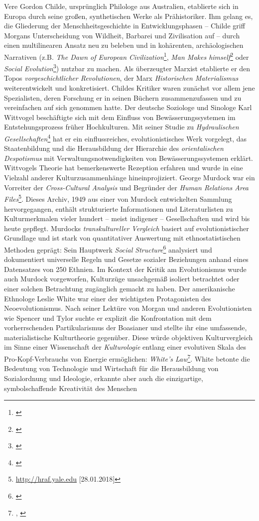 \documentclass[openany,twoside,twocolumn]{book}
\let\rmarkdownfootnote\footnote%
\def\footnote{\protect\rmarkdownfootnote}
\begin{document}
Vere Gordon Childe, ursprünglich Philologe aus Australien, etablierte sich in Europa durch seine großen, synthetischen Werke als Prähistoriker. Ihm gelang es, die Gliederung der Menschheitsgeschichte in Entwicklungsphasen -- Childe griff Morgans Unterscheidung von Wildheit, Barbarei und Zivilisation auf -- durch einen multilinearen Ansatz neu zu beleben und in kohärenten, archäologischen Narrativen (z.B. \emph{The Dawn of European Civilization}\footnote{\textcite{childe_dawn_1925}}, \emph{Man Makes himself}\footnote{\textcite{childe_man_1936}} oder \emph{Social Evolution}\footnote{\textcite{childe_social_1951}}) nutzbar zu machen. Als überzeugter Marxist etablierte er den Topos \emph{vorgeschichtlicher Revolutionen}, der Marx \emph{Historischen Materialismus} weiterentwickelt und konkretisiert. Childes Kritiker waren zunächst vor allem jene Spezialisten, deren Forschung er in seinen Büchern zusammenzufassen und zu vereinfachen auf sich genommen hatte. Der deutsche Soziologe und Sinologe Karl Wittvogel beschäftigte sich mit dem Einfluss von Bewässerungssystemen im Entstehungsprozess früher Hochkulturen. Mit seiner Studie zu \emph{Hydraulischen Gesellschaften}\footnote{\textcite{wittfogel_oriental_1957}} hat er ein einflussreiches, evolutionistisches Werk vorgelegt, das Staatenbildung und die Herausbildung der Hierarchie des \emph{orientalischen Despotismus} mit Verwaltungsnotwendigkeiten von Bewässerungssystemen erklärt. Wittvogels Theorie hat bemerkenswerte Rezeption erfahren und wurde in eine Vielzahl anderer Kulturzusammenhänge hineinprojiziert. George Murdock war ein Vorreiter der \emph{Cross-Cultural Analysis} und Begründer der \emph{Human Relations Area Files}\footnote{\url{http://hraf.yale.edu} {[}28.01.2018{]}}. Dieses Archiv, 1949 aus einer von Murdock entwickelten Sammlung hervorgegangen, enthält strukturierte Informationen und Literaturlisten zu Kulturmerkmalen vieler hundert -- meist indigener -- Gesellschaften und wird bis heute gepflegt. Murdocks \emph{transkultureller Vergleich} basiert auf evolutionistischer Grundlage und ist stark von quantitativer Auswertung mit ethnostatistischen Methoden geprägt: Sein Hauptwerk \emph{Social Structure}\footnote{\textcite{murdock_social_1949}} analysiert und dokumentiert universelle Regeln und Gesetze sozialer Beziehungen anhand eines Datensatzes von 250 Ethnien. Im Kontext der Kritik am Evolutionismus wurde auch Murdock vorgeworfen, Kulturzüge unsachgemäß isoliert betrachtet oder einer solchen Betrachtung zugänglich gemacht zu haben. Der amerikanische Ethnologe Leslie White war einer der wichtigsten Protagonisten des Neoevolutionismus. Nach seiner Lektüre von Morgan und anderen Evolutionisten wie Spencer und Tylor suchte er explizit die Konfrontation mit dem vorherrschenden Partikularismus der Boasianer und stellte ihr eine umfassende, materialistische Kulturtheorie gegenüber. Diese würde objektiven Kulturvergleich im Sinne einer Wissenschaft der \emph{Kulturologie} entlang einer evolutiven Skala des Pro-Kopf-Verbrauchs von Energie ermöglichen: \emph{White's Law}\footnote{\textcite{white_energy_1943}, \textcite{white_science_1949}}. White betonte die Bedeutung von Technologie und Wirtschaft für die Herausbildung von Sozialordnung und Ideologie, erkannte aber auch die einzigartige, symbolschaffende Kreativität des Menschen 
\end{document}
